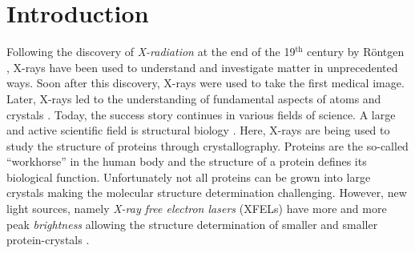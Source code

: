 \chapter{Introduction}
Following the discovery of \textit{X-radiation} at the end of the 19$^{\text{th}}$ century by R\"ontgen \cite{Roentgen-NP}, X-rays have been used to understand and investigate matter in unprecedented ways. Soon after this discovery, X-rays were used to take the first medical image. Later, X-rays led to the understanding of fundamental aspects of atoms \citep{Siegbahn-NP} and crystals \citep{Laue-NP,Bragg-NP}. Today, the success story continues in various fields of science. A large and active scientific field is structural biology \cite{Karplus-NP,Kobilka-NP}. Here, X-rays are being used to study the structure of proteins through crystallography. Proteins are the so-called ``workhorse'' in the human body and the structure of a protein defines its biological function. Unfortunately not all proteins can be grown into large crystals making the molecular structure determination challenging. However, new light sources, namely \textit{X-ray free electron lasers} (XFELs) \citep{Ackermann-2007-NPho} have more and more peak \textit{brightness} allowing the structure determination of smaller and smaller protein-crystals \citep{Chapman-2011-Nature}.\\[1\baselineskip]
